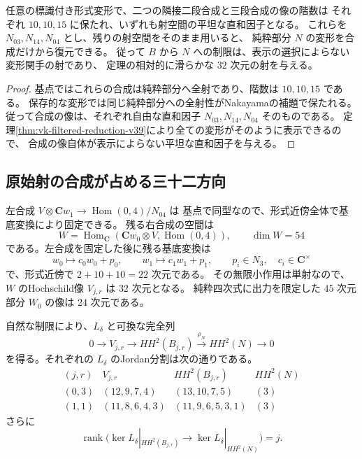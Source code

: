 \begin{corollary}[合成からの純粋部分の復元]
\label{cor:vk-intrinsic-pure-part-v39}
任意の標識付き形式変形で、二つの隣接二段合成と三段合成の像の階数は
それぞれ $10,10,15$ に保たれ、いずれも射空間の平坦な直和因子となる。
これらを $N_{03},N_{14},N_{04}$ とし、残りの射空間をそのまま用いると、
純粋部分 $N$ の変形を合成だけから復元できる。
従って $B$ から $N$ への制限は、表示の選択によらない変形関手の射であり、
定理の相対的に滑らかな $32$ 次元の射を与える。
\end{corollary}

\begin{proof}
基点ではこれらの合成は純粋部分へ全射であり、階数は $10,10,15$ である。
保存的な変形では同じ純粋部分への全射性がNakayamaの補題で保たれる。
従って合成の像は、それぞれ自由な直和因子 $N_{03},N_{14},N_{04}$ そのものである。
定理\ref{thm:vk-filtered-reduction-v39}により全ての変形がそのように表示できるので、
合成の像自体が表示によらない平坦な直和因子を与える。
\end{proof}

\subsection{原始射の合成が占める三十二方向}

左合成 $V\otimes\mathbf Cw_1\to\operatorname{Hom}(0,4)/N_{04}$ は
基点で同型なので、形式近傍全体で基底変換により固定できる。
残る右合成の空間は
\[
 W=\operatorname{Hom}_{\mathbf C}
   (\mathbf Cw_0\otimes V,\operatorname{Hom}(0,4)),\qquad \dim W=54
\]
である。左合成を固定した後に残る基底変換は
\[
 w_0\longmapsto c_0w_0+p_0,\qquad
 w_1\longmapsto c_1w_1+p_1,
 \qquad p_i\in N_3,\quad c_i\in\mathbf C^\times
\]
で、形式近傍で $2+10+10=22$ 次元である。
その無限小作用は単射なので、$W$ のHochschild像 $V_{j,r}$ は $32$ 次元となる。
純粋四次式に出力を限定した $45$ 次元部分 $W_0$ の像は $24$ 次元である。

\begin{proposition}[純粋部分への同変な完全列]
\label{prop:vk-pure-exact-sequence-v39}
自然な制限により、$L_\delta$ と可換な完全列
\begin{equation}
 0\longrightarrow V_{j,r}\longrightarrow HH^2(B_{j,r})
   \xrightarrow{\rho_N}HH^2(N)\longrightarrow0
 \label{eq:vk-pure-exact-sequence-v39}
\end{equation}
を得る。それぞれの $L_\delta$ のJordan分割は次の通りである。
\[
\begin{array}{c|c|c|c}
 (j,r)&V_{j,r}&HH^2(B_{j,r})&HH^2(N)\\\hline
 (0,3)&(12,9,7,4)&(13,10,7,5)&(3)\\
 (1,1)&(11,8,6,4,3)&(11,9,6,5,3,1)&(3)
\end{array}
\]
さらに
\[
 \operatorname{rank}\bigl(\ker L_\delta|_{HH^2(B_{j,r})}
          \longrightarrow\ker L_\delta|_{HH^2(N)}\bigr)=j.
\]
\end{proposition}

